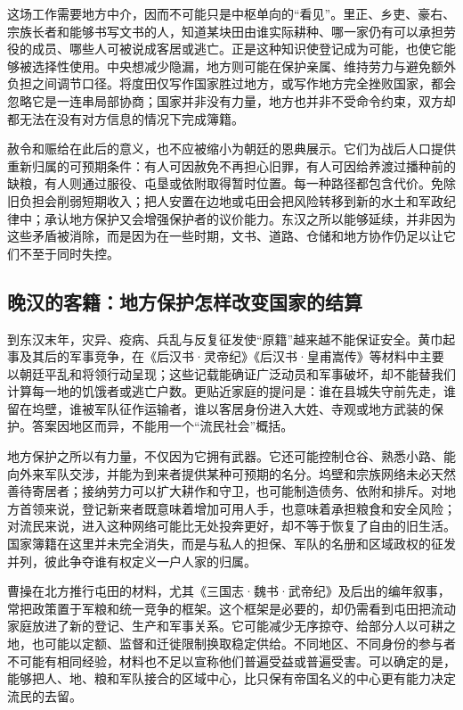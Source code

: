 这场工作需要地方中介，因而不可能只是中枢单向的“看见”。里正、乡吏、豪右、宗族长者和能够书写文书的人，知道某块田由谁实际耕种、哪一家仍有可以承担劳役的成员、哪些人可被说成客居或逃亡。正是这种知识使登记成为可能，也使它能够被选择性使用。中央想减少隐漏，地方则可能在保护亲属、维持劳力与避免额外负担之间调节口径。将度田仅写作国家胜过地方，或写作地方完全挫败国家，都会忽略它是一连串局部协商；国家并非没有力量，地方也并非不受命令约束，双方却都无法在没有对方信息的情况下完成簿籍。

赦令和赈给在此后的意义，也不应被缩小为朝廷的恩典展示。它们为战后人口提供重新归属的可预期条件：有人可因赦免不再担心旧罪，有人可因给养渡过播种前的缺粮，有人则通过服役、屯垦或依附取得暂时位置。每一种路径都包含代价。免除旧负担会削弱短期收入；把人安置在边地或屯田会把风险转移到新的水土和军政纪律中；承认地方保护又会增强保护者的议价能力。东汉之所以能够延续，并非因为这些矛盾被消除，而是因为在一些时期，文书、道路、仓储和地方协作仍足以让它们不至于同时失控。

\subsection{晚汉的客籍：地方保护怎样改变国家的结算}

到东汉末年，灾异、疫病、兵乱与反复征发使“原籍”越来越不能保证安全。黄巾起事及其后的军事竞争，在《后汉书·灵帝纪》《后汉书·皇甫嵩传》等材料中主要以朝廷平乱和将领行动呈现；这些记载能确证广泛动员和军事破坏，却不能替我们计算每一地的饥饿者或逃亡户数。更贴近家庭的提问是：谁在县城失守前先走，谁留在坞壁，谁被军队征作运输者，谁以客居身份进入大姓、寺观或地方武装的保护。答案因地区而异，不能用一个“流民社会”概括。

地方保护之所以有力量，不仅因为它拥有武器。它还可能控制仓谷、熟悉小路、能向外来军队交涉，并能为到来者提供某种可预期的名分。坞壁和宗族网络未必天然善待寄居者；接纳劳力可以扩大耕作和守卫，也可能制造债务、依附和排斥。对地方首领来说，登记新来者既意味着增加可用人手，也意味着承担粮食和安全风险；对流民来说，进入这种网络可能比无处投奔更好，却不等于恢复了自由的旧生活。国家簿籍在这里并未完全消失，而是与私人的担保、军队的名册和区域政权的征发并列，彼此争夺谁有权定义一户人家的归属。

曹操在北方推行屯田的材料，尤其《三国志·魏书·武帝纪》及后出的编年叙事，常把政策置于军粮和统一竞争的框架。这个框架是必要的，却仍需看到屯田把流动家庭放进了新的登记、生产和军事关系。它可能减少无序掠夺、给部分人以可耕之地，也可能以定额、监督和迁徙限制换取稳定供给。不同地区、不同身份的参与者不可能有相同经验，材料也不足以宣称他们普遍受益或普遍受害。可以确定的是，能够把人、地、粮和军队接合的区域中心，比只保有帝国名义的中心更有能力决定流民的去留。

